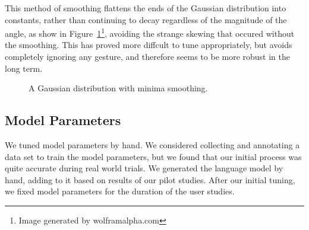 \documentclass[a4paper, 11pt]{article} %
\begin{document}
This method of smoothing flattens the ends of the Gaussian distribution into constants, rather than continuing to decay regardless of the magnitude of the angle, as show in Figure~\ref{fig:gauss}\footnote{Image generated by wolframalpha.com}, avoiding the strange skewing that occured without the smoothing. This has proved more diffcult to tune appropriately, but avoids completely ignoring any gesture, and therefore seems to be more robust in the long term.
\begin{figure}[h]
\centering
{}
\caption{A Gaussian distribution with minima smoothing.\label{fig:gauss}}
\end{figure}
\subsection{Model Parameters}
We tuned model parameters by hand. We considered collecting and annotating a data set to train the model parameters, but we found that our initial process was quite accurate during real world trials. We generated the language model by hand, adding to it based on results of our pilot studies. After our initial tuning, we fixed model parameters for the duration of the user studies. 
\end{document}
